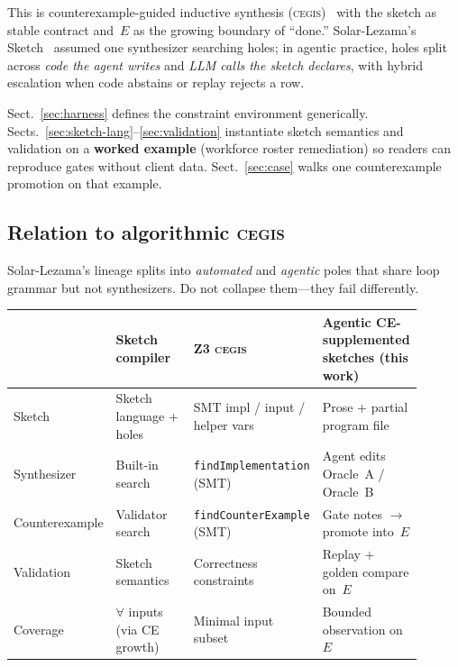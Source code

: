 \documentclass[11pt]{article}
\begin{document}
This is counterexample-guided inductive synthesis (\textsc{cegis})~\cite{solar2008sketching}
with the sketch as stable contract and~$E$ as the growing boundary of ``done.''
Solar-Lezama's Sketch~\cite{solar2013sketching} assumed one synthesizer searching holes;
in agentic practice, holes split across \emph{code the agent writes} and \emph{LLM calls
the sketch declares}, with hybrid escalation when code abstains or replay rejects a row.

Sect.~\ref{sec:harness} defines the constraint environment generically.
Sects.~\ref{sec:sketch-lang}--\ref{sec:validation} instantiate sketch semantics and
validation on a \textbf{worked example} (workforce roster remediation) so readers can
reproduce gates without client data.
Sect.~\ref{sec:case} walks one counterexample promotion on that example.

\subsection{Relation to algorithmic \textsc{cegis}}
\label{sec:related}

Solar-Lezama's lineage splits into \emph{automated} and \emph{agentic} poles that share
loop grammar but not synthesizers. Do not collapse them---they fail differently.

\begin{center}
\small
\begin{tabular}{p{0.22\linewidth}p{0.22\linewidth}p{0.22\linewidth}p{0.24\linewidth}}
\hline
 & Sketch compiler~\cite{solar2013sketching} & Z3 \textsc{cegis}~\cite{marcelwa2016cegis} & Agentic CE-supplemented sketches (this work) \\
\hline
Sketch & Sketch language + holes & SMT impl / input / helper vars & Prose + partial program file \\
Synthesizer & Built-in search & \texttt{findImplementation} (SMT) & Agent edits Oracle~A / Oracle~B \\
Counterexample & Validator search & \texttt{findCounterExample} (SMT) & Gate notes $\rightarrow$ promote into~$E$ \\
Validation & Sketch semantics & Correctness constraints & Replay + golden compare on~$E$ \\
Coverage & $\forall$ inputs (via CE growth) & Minimal input subset & Bounded observation on~$E$ \\
\hline
\end{tabular}
\end{center}
\end{document}
